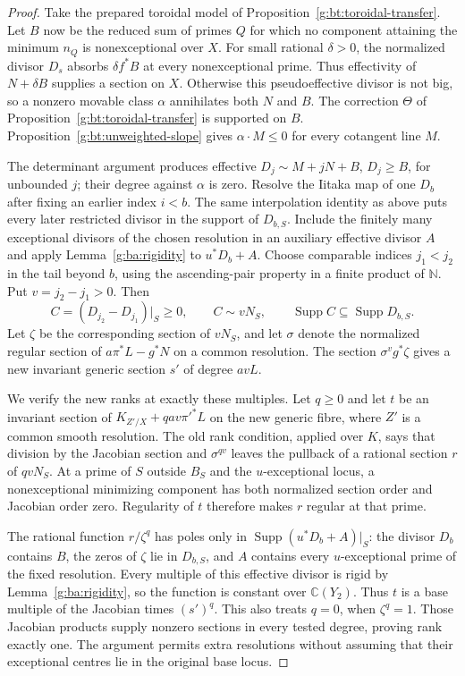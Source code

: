 \begin{proof}
Take the prepared toroidal model of
Proposition~\ref{g:bt:toroidal-transfer}.
Let $B$ now be the reduced sum of primes $Q$ for which no component
attaining the minimum $n_Q$ is nonexceptional over $X$.
For small rational $\delta>0$, the normalized divisor $D_s$ absorbs
$\delta f^*B$ at every nonexceptional prime.
Thus effectivity of $N+\delta B$ supplies a section on $X$.
Otherwise this pseudoeffective divisor is not big, so a nonzero movable
class $\alpha$ annihilates both $N$ and $B$.
The correction $\Theta$ of Proposition~\ref{g:bt:toroidal-transfer} is
supported on $B$.  Proposition~\ref{g:bt:unweighted-slope} gives
$\alpha\cdot M\leq0$ for every cotangent line $M$.

The determinant argument produces effective
$D_j\sim M+jN+B$, $D_j\geq B$, for unbounded $j$; their degree against
$\alpha$ is zero.  Resolve the Iitaka map of one $D_b$ after fixing
an earlier index $i<b$.  The same interpolation identity as above puts
every later restricted divisor in the support of $D_{b,S}$.
Include the finitely many exceptional divisors of the chosen resolution
in an auxiliary effective divisor $A$ and apply
Lemma~\ref{g:ba:rigidity} to $u^*D_b+A$.
Choose comparable indices $j_1<j_2$ in the tail beyond $b$, using
the ascending-pair property in a finite product of $\mathbb N$.
Put $v=j_2-j_1>0$. Then
\[
 C=(D_{j_2}-D_{j_1})|_S\geq0,\qquad C\sim vN_S,
 \qquad \operatorname{Supp}C\subseteq\operatorname{Supp}D_{b,S}.
\]
Let $\zeta$ be the corresponding section of $vN_S$, and let
$\sigma$ denote the normalized regular section of
$a\pi^*L-g^*N$ on a common resolution. The section
$\sigma^v g^*\zeta$ gives a new invariant generic section $s'$
of degree $avL$.

We verify the new ranks at exactly these multiples. Let $q\geq0$
and let $t$ be an invariant section of $K_{Z'/X}+qav\pi'^*L$
on the new generic fibre, where $Z'$ is a common smooth resolution.
The old rank condition, applied over $K$, says that division by
the Jacobian section and $\sigma^{qv}$ leaves the pullback of a
rational section $r$ of $qvN_S$. At a prime of $S$ outside $B_S$
and the $u$-exceptional locus, a nonexceptional minimizing component
has both normalized section order and Jacobian order zero.
Regularity of $t$ therefore makes $r$ regular at that prime.

The rational function $r/\zeta^q$ has poles only in
$\operatorname{Supp}(u^*D_b+A)|_S$: the divisor $D_b$ contains $B$,
the zeros of $\zeta$ lie in $D_{b,S}$, and $A$ contains every
$u$-exceptional prime of the fixed resolution.
Every multiple of this effective divisor is rigid by
Lemma~\ref{g:ba:rigidity}, so the function is constant over
$\mathbb C(Y_2)$. Thus $t$ is a base multiple of the Jacobian
times $(s')^q$. This also treats $q=0$, when $\zeta^q=1$.
Those Jacobian products supply nonzero sections in every tested
degree, proving rank exactly one. The argument permits extra
resolutions without assuming that their exceptional centres lie
in the original base locus.
\end{proof}


